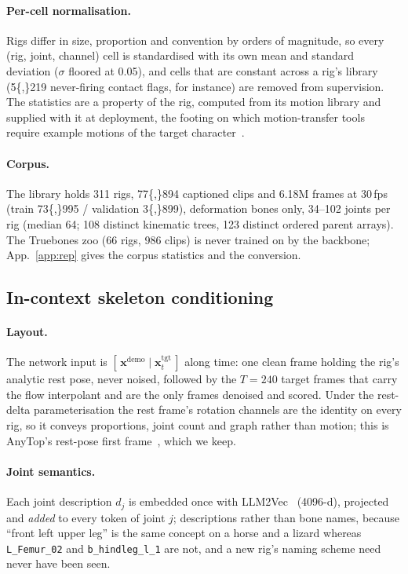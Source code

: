 \paragraph{Per-cell normalisation.} Rigs differ in size, proportion and convention by orders of
magnitude, so every (rig, joint, channel) cell is standardised with its own mean and standard
deviation ($\sigma$ floored at 0.05), and cells that are constant across a rig's library
(\num{5{,}219} never-firing contact flags, for instance) are removed from supervision. The
statistics are a property of the rig, computed from its motion library and supplied with it at
deployment, the footing on which motion-transfer tools require example motions of the target
character~\citep{chen2025motion2motion}.

\paragraph{Corpus.} The library holds \num{311} rigs, \num{77{,}894} captioned clips and
\num{6.18}M frames at 30\,fps (train \num{73{,}995} / validation \num{3{,}899}), deformation bones only, 34--102 joints per rig (median 64; \num{108} distinct kinematic trees, \num{123} distinct
ordered parent arrays). The Truebones zoo (66
rigs, 986 clips) is never trained on by the backbone; App.~\ref{app:rep} gives the corpus statistics and the conversion.

\subsection{In-context skeleton conditioning}\label{sec:method:model}

\paragraph{Layout.} The network input is $[\,\mathbf{x}^{\mathrm{demo}}\mid
\mathbf{x}_t^{\mathrm{tgt}}\,]$ along time: one clean frame holding the rig's analytic rest pose,
never noised, followed by the $T{=}240$ target frames that carry the flow interpolant and are the
only frames denoised and scored. Under the rest-delta parameterisation the rest frame's rotation
channels are the identity on every rig, so it conveys proportions, joint count and graph rather
than motion; this is AnyTop's rest-pose first frame~\citep{gat2025anytop}, which we keep.

\paragraph{Joint semantics.} Each joint description $d_j$ is embedded once with
LLM2Vec~\citep{behnamghader2024llm2vec} (4096-d), projected and \emph{added} to every token of joint
$j$; descriptions rather than bone names, because ``front left upper leg'' is the same concept on a
horse and a lizard whereas \texttt{L\_Femur\_02} and \texttt{b\_hindleg\_l\_1} are not, and a new
rig's naming scheme need never have been seen.

